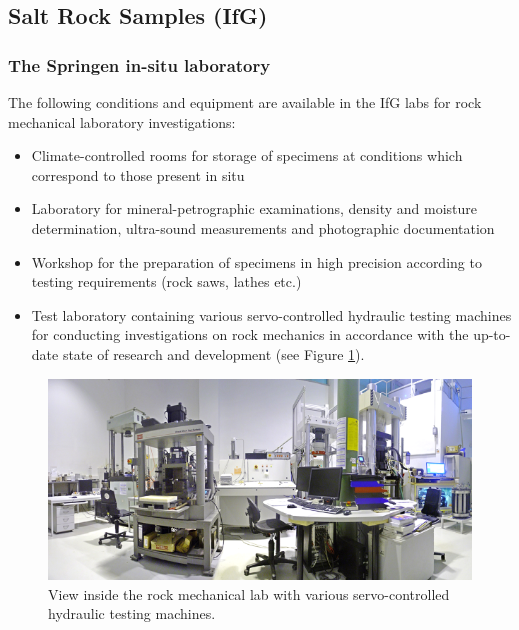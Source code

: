 \subsection{Salt Rock Samples (IfG)}

\subsubsection{The Springen in-situ laboratory}\label{sec:springen}


The following conditions and equipment are available in the IfG labs for rock mechanical laboratory investigations:

\begin{itemize}
\item Climate-controlled rooms for storage of specimens at conditions which correspond to those present in situ
\item Laboratory for mineral-petrographic examinations, density and moisture determination, ultra-sound measurements and 
photographic documentation
\item Workshop for the preparation of specimens in high precision according to testing requirements (rock saws, lathes etc.)
\item Test laboratory containing various servo-controlled hydraulic testing machines for conducting investigations on 
rock mechanics in accordance with the up-to-date state of research and development (see Figure \ref{fig:ifglabph1}).
\end{itemize} 

\begin{figure}[!ht]
\centering
\includegraphics[width=1\textwidth]{./figures/ifg-lab-photo1-v2.png}
\caption{View inside the rock mechanical lab with various servo-controlled hydraulic testing machines.}
\label{fig:ifglabph1}
\end{figure}


